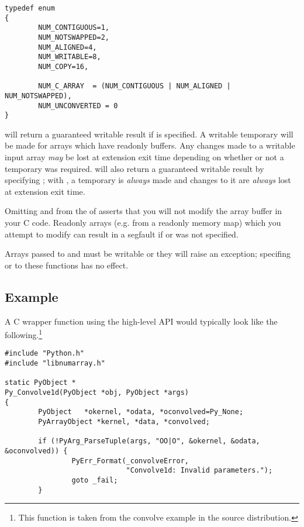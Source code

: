 \begin{verbatim}
typedef enum
{
        NUM_CONTIGUOUS=1,
        NUM_NOTSWAPPED=2,
        NUM_ALIGNED=4,
        NUM_WRITABLE=8,
        NUM_COPY=16,

        NUM_C_ARRAY  = (NUM_CONTIGUOUS | NUM_ALIGNED | NUM_NOTSWAPPED),
        NUM_UNCONVERTED = 0
}
\end{verbatim}

 will return a guaranteed writable result if
 is specified. A writable temporary will be made for
arrays which have readonly buffers.  Any changes made to a writable input array
\emph{may} be lost at extension exit time depending on whether or not a
temporary was required.   will also return a guaranteed
writable result by specifying ; with , a
temporary is \emph{always} made and changes to it are \emph{always} lost at
extension exit time.

Omitting  and  from the
 of  asserts that you will not modify the
array buffer in your C code.  Readonly arrays (e.g. from a readonly memory map)
which you attempt to modify can result in a segfault if 
or  was not specified.

Arrays passed to  and  must be
writable or they will raise an exception; specifing  or
 to these functions has no effect.

\subsection{Example}
\label{sec:C-API:high-level:example}

A C wrapper function using the high-level API would typically look like the
following.\footnote{This function is taken from the convolve example in the
source distribution.}

\begin{verbatim}
#include "Python.h"
#include "libnumarray.h"

static PyObject *
Py_Convolve1d(PyObject *obj, PyObject *args)
{
        PyObject   *okernel, *odata, *oconvolved=Py_None;
        PyArrayObject *kernel, *data, *convolved;

        if (!PyArg_ParseTuple(args, "OO|O", &okernel, &odata, &oconvolved)) {
                PyErr_Format(_convolveError, 
                             "Convolve1d: Invalid parameters.");
                goto _fail;
        }

\end{verbatim}

